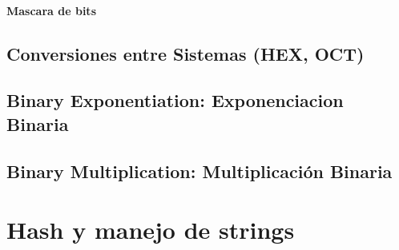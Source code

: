 \documentclass[12pt, fleqn]{report}                             %
\theoremstyle{break}                                            %
\begin{document}
            \subsubsection{Mascara de bits}


        \section{Conversiones entre Sistemas (HEX, OCT)}

        \section{Binary Exponentiation: Exponenciacion Binaria}

        \section{Binary Multiplication: Multiplicación Binaria}


    \clearpage
    \chapter{Hash y manejo de strings}


    \clearpage
\end{document}
